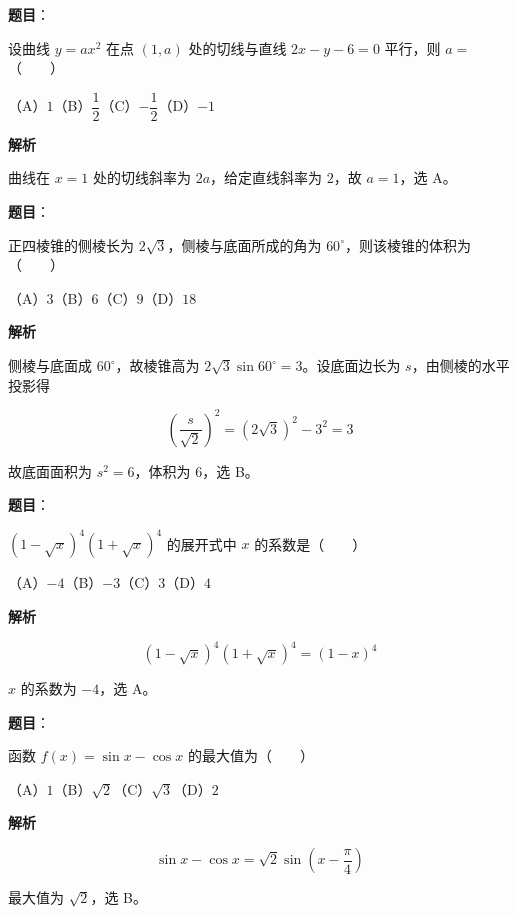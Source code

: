 \begin{answer}

\textbf{题目}：

设曲线 $y=ax^2$ 在点 $(1,a)$ 处的切线与直线 $2x-y-6=0$ 平行，则 $a=$\mbox{（　　）}

（A）$1$\quad（B）$\dfrac12$\quad（C）$-\dfrac12$\quad（D）$-1$

\textbf{解析}

曲线在 $x=1$ 处的切线斜率为 $2a$，给定直线斜率为 $2$，故 $a=1$，选 A。


\end{answer}
\begin{answer}

\textbf{题目}：

正四棱锥的侧棱长为 $2\sqrt3$，侧棱与底面所成的角为 $60^\circ$，则该棱锥的体积为\mbox{（　　）}

（A）$3$\quad（B）$6$\quad（C）$9$\quad（D）$18$

\textbf{解析}

侧棱与底面成 $60^\circ$，故棱锥高为 $2\sqrt3\sin60^\circ=3$。设底面边长为 $s$，由侧棱的水平投影得

\nopagebreak[4]
\[
\left(\frac{s}{\sqrt2}\right)^2=(2\sqrt3)^2-3^2=3
\]

故底面面积为 $s^2=6$，体积为 $6$，选 B。


\end{answer}
\begin{answer}

\textbf{题目}：

$(1-\sqrt{x})^4(1+\sqrt{x})^4$ 的展开式中 $x$ 的系数是\mbox{（　　）}

（A）$-4$\quad（B）$-3$\quad（C）$3$\quad（D）$4$

\textbf{解析}

\nopagebreak[4]
\[
(1-\sqrt x)^4(1+\sqrt x)^4=(1-x)^4
\]

$x$ 的系数为 $-4$，选 A。


\end{answer}
\begin{answer}

\textbf{题目}：

函数 $f(x)=\sin x-\cos x$ 的最大值为\mbox{（　　）}

（A）$1$\quad（B）$\sqrt2$\quad（C）$\sqrt3$\quad（D）$2$

\textbf{解析}

\nopagebreak[4]
\[
\sin x-\cos x=\sqrt2\sin\left(x-\frac\pi4\right)
\]

最大值为 $\sqrt2$，选 B。


\end{answer}
